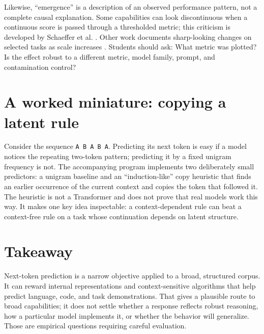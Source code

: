 \documentclass[11pt]{article}
\begin{document}
Likewise, ``emergence'' is a description of an observed performance pattern, not a complete causal explanation. Some capabilities can look discontinuous when a continuous score is passed through a thresholded metric; this criticism is developed by Schaeffer et al. \cite{schaeffer2023mirage}. Other work documents sharp-looking changes on selected tasks as scale increases \cite{wei2022emergent}. Students should ask: What metric was plotted? Is the effect robust to a different metric, model family, prompt, and contamination control?

\section{A worked miniature: copying a latent rule}
Consider the sequence \texttt{A B A B A}. Predicting its next token is easy if a model notices the repeating two-token pattern; predicting it by a fixed unigram frequency is not. The accompanying program implements two deliberately small predictors: a unigram baseline and an ``induction-like'' copy heuristic that finds an earlier occurrence of the current context and copies the token that followed it. The heuristic is not a Transformer and does not prove that real models work this way. It makes one key idea inspectable: a context-dependent rule can beat a context-free rule on a task whose continuation depends on latent structure.

\section{Takeaway}
Next-token prediction is a narrow objective applied to a broad, structured corpus. It can reward internal representations and context-sensitive algorithms that help predict language, code, and task demonstrations. That gives a plausible route to broad capabilities; it does not settle whether a response reflects robust reasoning, how a particular model implements it, or whether the behavior will generalize. Those are empirical questions requiring careful evaluation.



\end{document}
